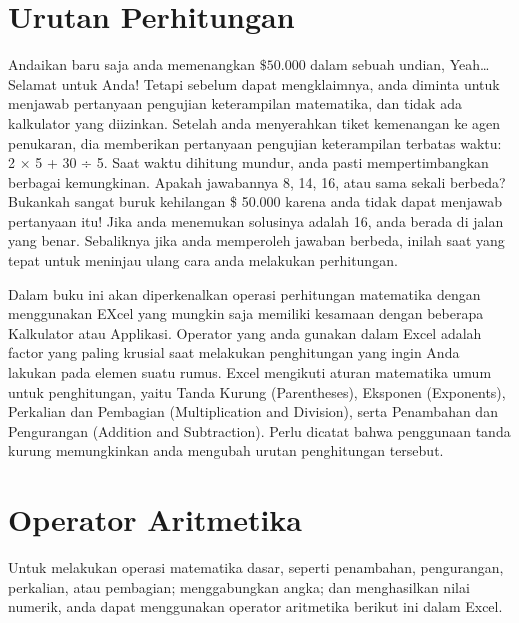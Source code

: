 \documentclass[
]{book}
\begin{document}
\hypertarget{urutan-perhitungan}{%
\section{Urutan Perhitungan}\label{urutan-perhitungan}}

Andaikan baru saja anda memenangkan \(\$ 50.000\) dalam sebuah undian, Yeah\ldots{} Selamat untuk Anda! Tetapi sebelum dapat mengklaimnya, anda diminta untuk menjawab pertanyaan pengujian keterampilan matematika, dan tidak ada kalkulator yang diizinkan. Setelah anda menyerahkan tiket kemenangan ke agen penukaran, dia memberikan pertanyaan pengujian keterampilan terbatas waktu: 2 × 5 + 30 ÷ 5. Saat waktu dihitung mundur, anda pasti mempertimbangkan berbagai kemungkinan. Apakah jawabannya 8, 14, 16, atau sama sekali berbeda? Bukankah sangat buruk kehilangan \$ 50.000 karena anda tidak dapat menjawab pertanyaan itu! Jika anda menemukan solusinya adalah 16, anda berada di jalan yang benar. Sebaliknya jika anda memperoleh jawaban berbeda, inilah saat yang tepat untuk meninjau ulang cara anda melakukan perhitungan.

Dalam buku ini akan diperkenalkan operasi perhitungan matematika dengan menggunakan EXcel yang mungkin saja memiliki kesamaan dengan beberapa Kalkulator atau Applikasi. Operator yang anda gunakan dalam Excel adalah factor yang paling krusial saat melakukan penghitungan yang ingin Anda lakukan pada elemen suatu rumus. Excel mengikuti aturan matematika umum untuk penghitungan, yaitu Tanda Kurung (Parentheses), Eksponen (Exponents), Perkalian dan Pembagian (Multiplication and Division), serta Penambahan dan Pengurangan (Addition and Subtraction). Perlu dicatat bahwa penggunaan tanda kurung memungkinkan anda mengubah urutan penghitungan tersebut.

\hypertarget{operator-aritmetika}{%
\section{Operator Aritmetika}\label{operator-aritmetika}}

Untuk melakukan operasi matematika dasar, seperti penambahan, pengurangan, perkalian, atau pembagian; menggabungkan angka; dan menghasilkan nilai numerik, anda dapat menggunakan operator aritmetika berikut ini dalam Excel.
\end{document}
